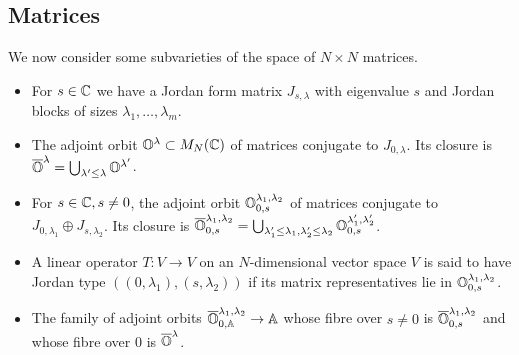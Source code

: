 \documentclass[draft]{article}
\begin{document}
\subsection{Matrices}
 We now consider some subvarieties of the space of $ N\times N$ matrices. 

\begin{itemize}
    \item For $ s \in \mathbb C$ 
    we have a Jordan form matrix $ J_{s,\lambda}$ with eigenvalue $ s$ and Jordan blocks of sizes $ \lambda_1, \dots, \lambda_m$. 
    \item The adjoint orbit $ \mathbb O^\lambda \subset M_N(\mathbb C)$ of matrices conjugate to $ J_{0,\lambda}$.  Its closure is $ \overline{\mathbb O}^\lambda = \bigcup_{\lambda' \le \lambda} \mathbb O^{\lambda'}$.
    \item For $ s \in \mathbb C, s \ne 0$, the adjoint orbit $ \mathbb O^{\lambda_1, \lambda_2}_{0,s}$ of matrices conjugate to $ J_{0,\lambda_1} \oplus J_{s,\lambda_2}$.  Its closure is $ \overline{\mathbb O}^{\lambda_1, \lambda_2}_{0,s} = \bigcup_{\lambda_1' \le \lambda_1, \lambda'_2 \le \lambda_2} \mathbb O^{\lambda_1', \lambda'_2}_{0,s}$. 
    \item A linear operator $ T : V \rightarrow V $ on an $N$-dimensional vector space $V$ is said to have Jordan type $((0,\lambda_1), (s,\lambda_2))$ if its matrix representatives lie in $ \mathbb O^{\lambda_1, \lambda_2}_{0,s}$.
    \item The family of adjoint orbits $ \overline{\mathbb O}^{\lambda_1, \lambda_2}_{0,\mathbb A} \rightarrow \mathbb A$ whose fibre over $ s \ne 0 $ is $ \overline{\mathbb O}^{\lambda_1, \lambda_2}_{0,s}$ and whose fibre over 0 is $\overline{\mathbb O}^\lambda$.  
    
    

\end{itemize}
\end{document}
